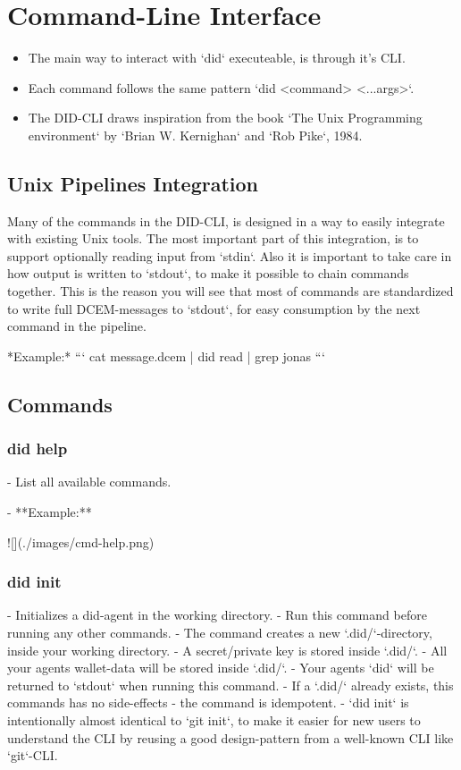 \chapter{Command-Line Interface}

\begin{itemize}
\item The main way to interact with `did` executeable, is through it's CLI.
\item Each command follows the same pattern `did <command> <...args>`.
\item The DID-CLI draws inspiration from the book `The Unix Programming environment` by `Brian W. Kernighan` and `Rob Pike`, 1984.
\end{itemize}

\section{Unix Pipelines Integration}

Many of the commands in the DID-CLI, is designed in a way to easily integrate with existing Unix tools. The most important part of this integration, is to support optionally reading input from `stdin`. Also it is important to take care in how output is written to `stdout`, to make it possible to chain commands together. This is the reason you will see that most of commands are standardized to write full DCEM-messages to `stdout`, for easy consumption by the next command in the pipeline.

*Example:*
```
cat message.dcem | did read | grep jonas 
```


\section{Commands}

\subsection{did help}

- List all available commands.

- **Example:**

    ![](./images/cmd-help.png)

\subsection{did init}

- Initializes a did-agent in the working directory.
- Run this command before running any other commands.
- The command creates a new `.did/`-directory, inside your working directory.
- A secret/private key is stored inside `.did/`.
- All your agents wallet-data will be stored inside `.did/`.
- Your agents `did` will be returned to `stdout` when running this command.
- If a `.did/` already exists, this commands has no side-effects - the command is idempotent.
- `did init` is intentionally almost identical to `git init`, to make it easier for new users to understand the CLI by reusing a good design-pattern from a well-known CLI like `git`-CLI.

